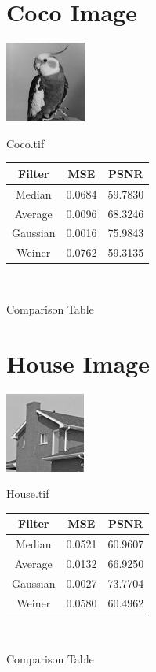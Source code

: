 \section*{Coco Image}
\begin{center}
	\includegraphics{coco.png}
	
	\vspace{1cm}
	Coco.tif
	
	\begin{tabular}{|c|c|c|}
		\hline 
		Filter & MSE & PSNR \\ 
		\hline 
		Median & 0.0684 & 59.7830 \\ 
		\hline 
		Average & 0.0096 & 68.3246 \\ 
		\hline 
		Gaussian & 0.0016 & 75.9843 \\ 
		\hline 
		Weiner & 0.0762 & 59.3135 \\ 
		\hline 
	\end{tabular} 
	
	\
	
	Comparison Table
\end{center}
\vspace{3cm}

\section*{House Image}
\begin{center}
	\includegraphics{house.png}
	
	\vspace{1cm}
	House.tif
	
	\begin{tabular}{|c|c|c|}
		\hline 
		Filter & MSE & PSNR \\ 
		\hline 
		Median & 0.0521 & 60.9607 \\ 
		\hline 
		Average & 0.0132 & 66.9250 \\ 
		\hline 
		Gaussian & 0.0027 & 73.7704 \\ 
		\hline 
		Weiner & 0.0580 & 60.4962 \\ 
		\hline 
	\end{tabular} 
	
	\
	
	Comparison Table
\end{center}
\vspace{3cm}

